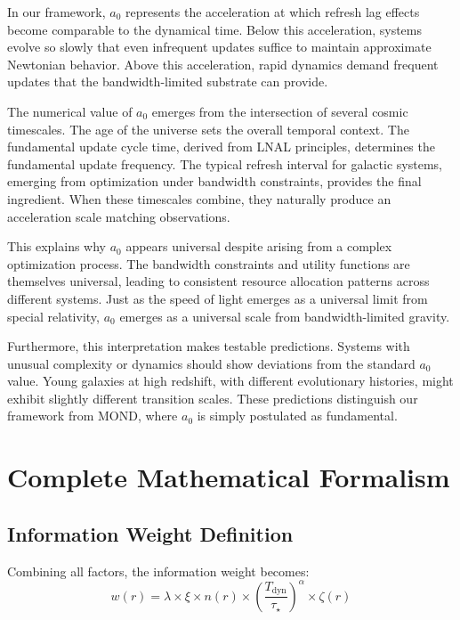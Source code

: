 \documentclass[usenatbib]{mnras}
\begin{document}
In our framework, $a_0$ represents the acceleration at which refresh lag effects become comparable to the dynamical time. Below this acceleration, systems evolve so slowly that even infrequent updates suffice to maintain approximate Newtonian behavior. Above this acceleration, rapid dynamics demand frequent updates that the bandwidth-limited substrate can provide.

The numerical value of $a_0$ emerges from the intersection of several cosmic timescales. The age of the universe sets the overall temporal context. The fundamental update cycle time, derived from LNAL principles, determines the fundamental update frequency. The typical refresh interval for galactic systems, emerging from optimization under bandwidth constraints, provides the final ingredient. When these timescales combine, they naturally produce an acceleration scale matching observations.

This explains why $a_0$ appears universal despite arising from a complex optimization process. The bandwidth constraints and utility functions are themselves universal, leading to consistent resource allocation patterns across different systems. Just as the speed of light emerges as a universal limit from special relativity, $a_0$ emerges as a universal scale from bandwidth-limited gravity.

Furthermore, this interpretation makes testable predictions. Systems with unusual complexity or dynamics should show deviations from the standard $a_0$ value. Young galaxies at high redshift, with different evolutionary histories, might exhibit slightly different transition scales. These predictions distinguish our framework from MOND, where $a_0$ is simply postulated as fundamental.

\section{Complete Mathematical Formalism}
\label{sec:formalism}

\subsection{Information Weight Definition}

Combining all factors, the information weight becomes:
\begin{equation}
w(r) = \lambda \times \xi \times n(r) \times \left(\frac{T_{\text{dyn}}}{\tau_\star}\right)^\alpha \times \zeta(r)
\end{equation}
\end{document}
